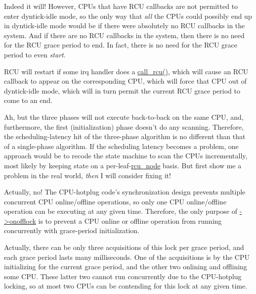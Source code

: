 
Indeed it will!
However, CPUs that have RCU callbacks are not permitted to enter
dyntick-idle mode, so the only way that \emph{all} the CPUs could
possibly end up in dyntick-idle mode would be if there were
absolutely no RCU callbacks in the system.
And if there are no RCU callbacks in the system, then there is no
need for the RCU grace period to end.
In fact, there is no need for the RCU grace period to even \emph{start}.

RCU will restart if some irq handler does a \url{call_rcu()},
which will cause an RCU callback to appear on the corresponding CPU,
which will force that CPU out of dyntick-idle mode, which will in turn
permit the current RCU grace period to come to an end.


Ah, but the three phases will not execute back-to-back on the same CPU,
and, furthermore, the first (initialization) phase doesn't do any scanning.
Therefore, the scheduling-latency hit of the three-phase algorithm is no
different than that of a single-phase algorithm.
If the scheduling latency becomes a problem, one approach would be to
recode the state machine to scan the CPUs incrementally, most likely
by keeping state on a per-leaf-\url{rcu_node} basis.
But first show me a problem in the real world, \emph{then}
I will consider fixing it!


Actually, no!
The CPU-hotplug code's synchronization design prevents multiple
concurrent CPU online/offline operations, so only one CPU online/offline
operation can be executing at any given time.
Therefore, the only purpose of \url{->onofflock} is to prevent a CPU
online or offline operation from running concurrently with grace-period
initialization.


Actually, there can be only three acquisitions of this lock per grace
period, and each grace period lasts many milliseconds.
One of the acquisitions is by the CPU initializing for the current
grace period, and the other two onlining and offlining some CPU.
These latter two cannot run concurrently due to the CPU-hotplug
locking, so at most two CPUs can be contending for this lock at any
given time.

